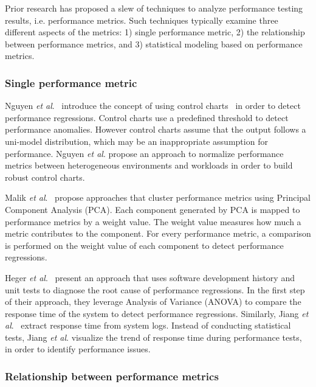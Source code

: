 \documentclass[smallextended]{svjour3}       %
\begin{document}
Prior research has proposed a slew of techniques to analyze performance testing results, i.e. performance metrics. Such techniques typically examine three different aspects of the metrics: 1) single performance metric, 2) the relationship between performance metrics, and 3) statistical modeling based on performance metrics.


\subsubsection{Single performance metric}
\label{sec:relatedindividual}
Nguyen \textit{et al$.$}~\cite{Nguyen:2012:ADP:2188286.2188344} introduce the concept of using control charts~\cite{shewhart1931economic} in order to detect performance regressions. Control charts use a predefined threshold to detect performance anomalies. However control charts assume that the output follows a uni-model distribution, which may be an inappropriate assumption for performance. Nguyen \textit{ et al$.$} propose an approach to normalize performance metrics between heterogeneous environments and workloads in order to build robust control charts. %

Malik \emph{et al$.$}~\cite{Malik:2010:ACL:1955601.1955936, haroon} propose approaches that cluster performance metrics using Principal Component Analysis (PCA). Each component generated by PCA is mapped to performance metrics by a weight value. The weight value measures how much a metric contributes to the component. For every performance metric, a comparison is performed on the weight value of each component to detect performance regressions.

Heger \emph{et al$.$}~\cite{DBLP:conf/wosp/HegerHF13} present an approach that uses software development history and unit tests to diagnose the root cause of performance regressions. In the first step of their approach, they leverage Analysis of Variance (ANOVA) to compare the response time of the system to detect performance regressions. Similarly, Jiang \emph{et al$.$}~\cite{jackicsm2009} extract response time from system logs. Instead of conducting statistical tests, Jiang \emph{et al$.$} visualize the trend of response time during performance tests, in order to identify performance issues.


\subsubsection{Relationship between performance metrics}
\label{sec:relatedrelation}
\end{document}
